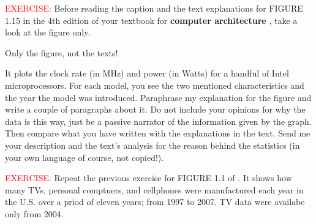 \documentclass{article}
\begin{document}
\begin{framed}
\noindent \textcolor{red}{EXERCISE:} Before reading the caption and the text explanations for FIGURE 1.15 in the 4th edition of your textbook for \textbf{computer architecture} \cite{patterson}, take a look at the figure only. 
	\begin{framed}
\noindent {} Only the figure, not the texts! 
	\end{framed}
	\noindent It plots the clock rate (in MHz) and power (in Watts) for a handful of Intel microprocessors. For each model, you see the two mentioned characteristics and the year the model was introduced. Paraphrase my explanation for the figure and write a couple of paragraphs about it. Do not include your opinions for why the data is this way, just be a passive narrator of the information given by the graph. Then compare what you have written with the explanations in the text. Send me your description and the text's analysis for the reason behind the statistics (in your own language of course, not copied!). 

\noindent \textcolor{red}{EXERCISE:} Repeat the previous exercise for FIGURE 1.1 of \cite{patterson}. It shows how many TVs, personal comptuers, and cellphones were manufactured each year in the U.S. over a priod of eleven years; from 1997 to 2007. TV data were availabe only from 2004.
\end{framed}


\end{document}
